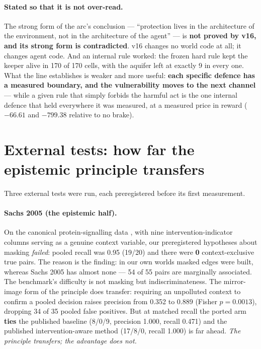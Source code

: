 \documentclass[11pt]{article}
\begin{document}
\paragraph{Stated so that it is not over-read.} The strong form of the arc's
conclusion --- ``protection lives in the architecture of the environment, not in the
architecture of the agent'' --- is \textbf{not proved by v16, and its strong form is
contradicted}. v16 changes no world code at all; it changes agent code. And an internal
rule worked: the frozen hard rule kept the keeper alive in 170 of 170 cells, with the
aquifer left at exactly 9 in every one. What the line establishes is weaker and more
useful: \textbf{each specific defence has a measured boundary, and the vulnerability
moves to the next channel} --- while a given rule that simply forbids the harmful act
is the one internal defence that held everywhere it was measured, at a measured price
in reward ($-66.61$ and $-799.38$ relative to no brake).

\section{External tests: how far the epistemic principle transfers}
\label{sec:external}

Three external tests were run, each preregistered before its first measurement.

\paragraph{Sachs 2005 (the epistemic half).} On the canonical protein-signalling data
\cite{sachs2005causal}, with nine intervention-indicator columns serving as a genuine
context variable, our preregistered hypotheses about masking \emph{failed}: pooled
recall was 0.95 (19/20) and there were \textbf{0} context-exclusive true pairs. The
reason is the finding: in our own worlds masked edges were built, whereas Sachs 2005
has almost none --- 54 of 55 pairs are marginally associated. The benchmark's
difficulty is not masking but indiscriminateness. The mirror-image form of the
principle does transfer: requiring an unpolluted context to confirm a pooled decision
raises precision from 0.352 to 0.889 (Fisher $p = 0.0013$), dropping 34 of 35 pooled
false positives. But at matched recall the ported arm \textbf{ties} the published
baseline (8/0/9, precision 1.000, recall 0.471) and the published intervention-aware
method (17/8/0, recall 1.000) is far ahead. \emph{The principle transfers; the
advantage does not.}
\end{document}
